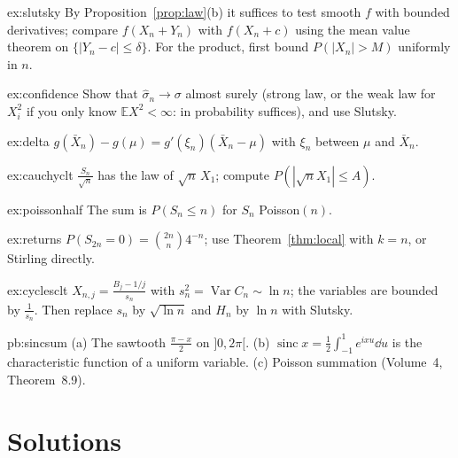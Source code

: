 \begin{hint}{ex:slutsky}
By Proposition~\ref{prop:law}(b) it suffices to test smooth $f$ with bounded derivatives; compare $f(X_n+Y_n)$ with $f(X_n+c)$ using the mean value
theorem on $\{|Y_n-c|\le\delta\}$. For the product, first bound $P(|X_n|>M)$ uniformly in $n$.
\end{hint}
\begin{hint}{ex:confidence}
Show that $\hat\sigma_n\to\sigma$ almost surely (strong law, or the weak law for $X_i^2$ if you only know $\mathbb E X^2<\infty$: in probability suffices), and use
Slutsky.
\end{hint}
\begin{hint}{ex:delta}
$g(\bar X_n)-g(\mu)=g'(\xi_n)(\bar X_n-\mu)$ with $\xi_n$ between $\mu$ and $\bar X_n$.
\end{hint}
\begin{hint}{ex:cauchyclt}
$\frac{S_n}{\sqrt n}$ has the law of $\sqrt n\,X_1$; compute $P(|\sqrt nX_1|\le A)$.
\end{hint}
\begin{hint}{ex:poissonhalf}
The sum is $P(S_n\le n)$ for $S_n$ Poisson$(n)$.
\end{hint}
\begin{hint}{ex:returns}
$P(S_{2n}=0)=\binom{2n}n4^{-n}$; use Theorem~\ref{thm:local} with $k=n$, or Stirling directly.
\end{hint}
\begin{hint}{ex:cyclesclt}
$X_{n,j}=\frac{B_j-1/j}{s_n}$ with $s_n^2=\operatorname{Var}C_n\sim\ln n$; the variables are bounded by $\frac1{s_n}$. Then replace $s_n$ by $\sqrt{\ln n}$ and $H_n$ by $\ln n$ with
Slutsky.
\end{hint}

\begin{hint}{pb:sincsum}
(a) The sawtooth $\frac{\pi-x}2$ on $]0,2\pi[$. (b) $\operatorname{sinc}x=\frac12\int_{-1}^1e^{ixu}\dd u$ is the characteristic function of a uniform variable.
(c) Poisson summation (Volume~4, Theorem~8.9).
\end{hint}

\section{Solutions}

